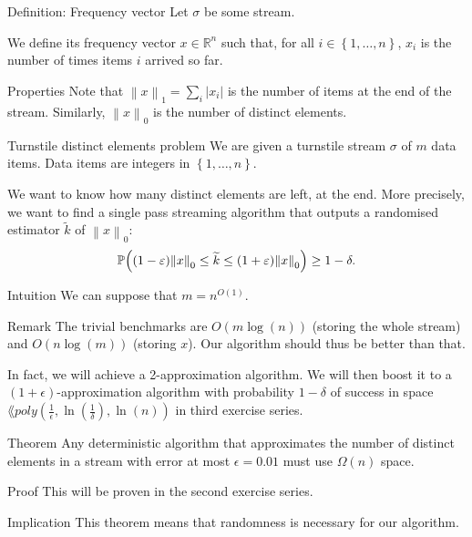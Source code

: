 \documentclass[a4paper]{article}
\begin{document}
\begin{parag}{Definition: Frequency vector}
    Let $\sigma$ be some stream.

    We define its frequency vector $x \in \mathbb{R}^n$ such that, for all $i \in \left\{1, \ldots, n\right\}$, $x_i$ is the number of times items $i$ arrived so far.

    \begin{subparag}{Properties}
        Note that $\left\|x\right\|_1 = \sum_{i} \left|x_i\right|$ is the number of items at the end of the stream. Similarly, $\left\|x\right\|_0$ is the number of distinct elements.
    \end{subparag}
\end{parag}

\begin{parag}{Turnstile distinct elements problem}
    We are given a turnstile stream $\sigma$ of $m$ data items. Data items are integers in $\left\{1, \ldots, n\right\}$.

    We want to know how many distinct elements are left, at the end. More precisely, we want to find a single pass streaming algorithm that outputs a randomised estimator $\widetilde{k}$ of $\left\|x\right\|_0$:
    \[\prob\left(\left(1- \epsilon\right) \left\|x\right\|_0 \leq \widetilde{k} \leq \left(1+\epsilon\right) \left\|x\right\|_0\right) \geq 1 - \delta.\]

    \begin{subparag}{Intuition}
         We can suppose that $m = n^{O\left(1\right)}$.
    \end{subparag}

    \begin{subparag}{Remark}
        The trivial benchmarks are $O\left(m \log\left(n\right)\right)$ (storing the whole stream) and $O\left(n \log\left(m\right)\right)$ (storing $x$). Our algorithm should thus be better than that.

        In fact, we will achieve a 2-approximation algorithm. We will then boost it to a $\left(1+\epsilon\right)$-approximation algorithm with probability $1 - \delta$ of success in space $\lang{poly}\left(\frac{1}{\epsilon}, \ln\left(\frac{1}{\delta}\right), \ln\left(n\right)\right)$ in third exercise series.
    \end{subparag}
\end{parag}

\begin{parag}{Theorem}
    Any deterministic algorithm that approximates the number of distinct elements in a stream with error at most $\epsilon = 0.01$ must use $\Omega\left(n\right)$ space.

    \begin{subparag}{Proof}
        This will be proven in the second exercise series.
    \end{subparag}

    \begin{subparag}{Implication}
        This theorem means that randomness is necessary for our algorithm.
    \end{subparag}
\end{parag}
\end{document}
